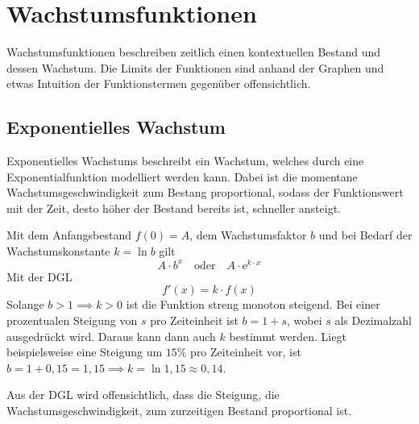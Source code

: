 \documentclass{article}
\begin{document}
 
\section{Wachstumsfunktionen}
Wachstumsfunktionen beschreiben zeitlich einen kontextuellen Bestand und dessen Wachstum. Die Limits der Funktionen sind anhand der Graphen und etwas Intuition der Funktionstermen gegenüber offensichtlich.
\subsection{Exponentielles Wachstum}
Exponentielles Wachstums beschreibt ein Wachstum, welches durch eine Exponentialfunktion modelliert werden kann. Dabei ist die momentane Wachstumsgeschwindigkeit zum Bestang proportional, sodass der Funktionswert mit der Zeit, desto höher der Bestand bereits ist, schneller ansteigt.
 
\noindent \begin{minipage}{5cm}
  \centering
\end{minipage}
\hfill
\begin{minipage}{\dimexpr\textwidth-5cm}
Mit dem Anfangsbestand $f(0)=A$, dem Wachstumsfaktor $b$ und bei Bedarf der Wachstumskonstante $k=\ln{b}$ gilt
\[ 
 A \cdot b^x 
 \quad \text{oder} \quad 
 A \cdot \mathrm{e}^{k \cdot x}
\] 
Mit der DGL 
\[
 f'(x) = k \cdot f(x) 
\] 
Solange ${b > 1 \implies k > 0}$ ist die Funktion streng monoton steigend. Bei einer prozentualen Steigung von $s$ pro Zeiteinheit ist ${b=1+s}$, wobei $s$ als Dezimalzahl ausgedrückt wird. Daraus kann dann auch $k$ bestimmt werden. \newline
Liegt beispielsweise eine Steigung um $15\%$ pro Zeiteinheit vor, ist ${b=1 + 0,15=1,15 \implies k=\ln{1,15} \approx 0,14}$. 
\end{minipage}
Aus der DGL wird offensichtlich, dass die Steigung, die Wachstumsgeschwindigkeit, zum zurzeitigen Bestand proportional ist.
 
\end{document}
